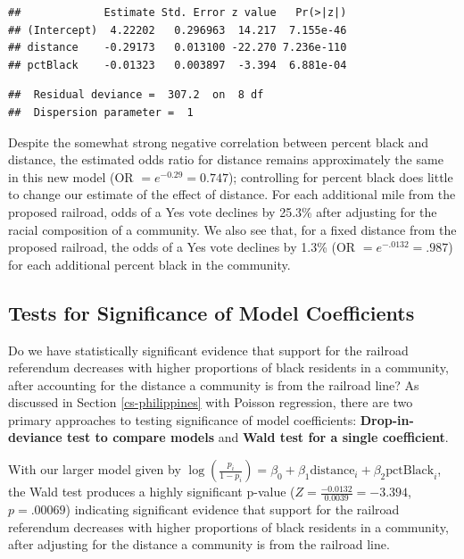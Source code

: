 \documentclass[
]{krantz}
\begin{document}
\begin{verbatim}
##             Estimate Std. Error z value   Pr(>|z|)
## (Intercept)  4.22202   0.296963  14.217  7.155e-46
## distance    -0.29173   0.013100 -22.270 7.236e-110
## pctBlack    -0.01323   0.003897  -3.394  6.881e-04
\end{verbatim}

\begin{verbatim}
##  Residual deviance =  307.2  on  8 df 
##  Dispersion parameter =  1
\end{verbatim}

Despite the somewhat strong negative correlation between percent black and distance, the estimated odds ratio for distance remains approximately the same in this new model (OR \(= e^{-0.29} = 0.747\)); controlling for percent black does little to change our estimate of the effect of distance. For each additional mile from the proposed railroad, odds of a Yes vote declines by 25.3\% after adjusting for the racial composition of a community. We also see that, for a fixed distance from the proposed railroad, the odds of a Yes vote declines by 1.3\% (OR \(= e^{-.0132} = .987\)) for each additional percent black in the community.

\hypertarget{sec-logisticInf}{%
\subsection{Tests for Significance of Model Coefficients}\label{sec-logisticInf}}

Do we have statistically significant evidence that support for the railroad referendum decreases with higher proportions of black residents in a community, after accounting for the distance a community is from the railroad line? As discussed in Section \ref{cs-philippines} with Poisson regression, there are two primary approaches to testing significance of model coefficients: \textbf{Drop-in-deviance test to compare models}  and \textbf{Wald test for a single coefficient}. 

With our larger model given by \(\log\left(\frac{p_i}{1-p_i}\right) = \beta_0+\beta_1\textrm{distance}_i+\beta_2\textrm{pctBlack}_i\), the Wald test produces a highly significant p-value (\(Z=\frac{-0.0132}{0.0039}= -3.394\), \(p=.00069\)) indicating significant evidence that support for the railroad referendum decreases with higher proportions of black residents in a community, after adjusting for the distance a community is from the railroad line.
\end{document}
